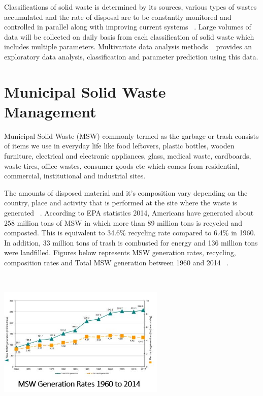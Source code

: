 \documentclass[sigconf]{acmart}
\begin{document}
Classifications of solid waste is determined by its sources, various types of wastes accumulated and the rate of disposal are to be constantly monitored and controlled in parallel along with improving current systems ~\cite{chandrappa2012}. Large volumes of data will be collected on daily basis from each classification of solid waste which includes multiple parameters. Multivariate data analysis methods ~\cite{bohm2013} provides an exploratory data analysis, classification and parameter prediction using this data.


\section{ Municipal Solid Waste Management}

Municipal Solid Waste (MSW) commonly termed as the garbage or trash consists of items we use in everyday life like food leftovers, plastic bottles, wooden furniture, electrical and electronic appliances, glass, medical waste, cardboards, waste tires, office wastes, consumer goods etc which comes from residential, commercial, institutional and industrial sites. 

The amounts of disposed material and it's composition vary depending on the country, place and activity that is performed at the site where the waste is generated ~\cite{chandrappa2012}. According to EPA statistics 2014, Americans have generated about 258 million tons of MSW in which more than 89 million tons is recycled and composted. This is equivalent to 34.6\% recycling rate compared to 6.4\% in 1960. In addition, 33 million tons of trash is combusted for energy and 136 million tons were landfilled. Figures below represents MSW generation rates, recycling, composition rates and Total MSW generation between 1960 and 2014 ~\cite{EPA2014}.

\includegraphics[width=8cm, height=7cm]{fig1.png}
\end{document}
